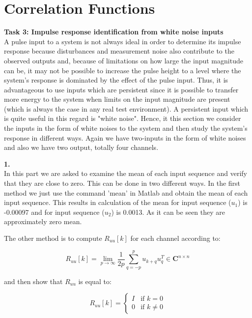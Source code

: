 \documentclass[paper=US leter, fontsize=11pt]{scrartcl}
\begin{document}
\section{Correlation Functions}
\textbf{Task 3: Impulse response identification from white noise inputs}\\
A pulse input to a system is not always ideal in order to determine its impulse response because disturbances
and measurement noise also contribute to the observed outputs and, because of limitations on how large the
input magnitude can be, it may not be possible to increase the pulse height to a level where the system's
response is dominated by the effect of the pulse input. Thus, it is advantageous to use inputs which are
persistent since it is possible to transfer more energy to the system when limits on the input magnitude are
present (which is always the case in any real test environment). A persistent input which is quite useful
in this regard is "white noise". Hence, it this section we consider the inputs in the form of white noises to the system and then study the system's response in different ways. Again we have two-inputs in the form of white noises and also we have two output, totally four channels.

\vspace{30pt}
\textbf{1.}\\
In this part we are asked to examine the mean of each input sequence and verify that they are close to zero. This can be done in two different ways. In the first method we just use the command 'mean' in Matlab and obtain the mean of each input sequence. This results in calculation of the mean for input sequence ($u_{1}$) is -0.00097 and for input sequence ($u_{2}$) is 0.0013. As it can be seen they are approximately zero mean.

The other method is to compute $R_{uu}[k]$ for each channel according to:

\begin{equation}
R_{uu}[k] = \lim\limits_{p \to \infty}\frac{1}{2p}\sum_{q=-p}^{p} u_{k+q}u_{q}^{T} \in \textbf{C}^{n\times n} 
\tag{5}
\end{equation} 


and then show that $R_{uu}$ is equal to:

	\[	R_{uu}[k] = 
	\begin{cases}
	\tag{6}
	I& \text{if } k = 0\\
	0              & \text{if } k \neq 0
	\end{cases}
	\]%
\end{document}
